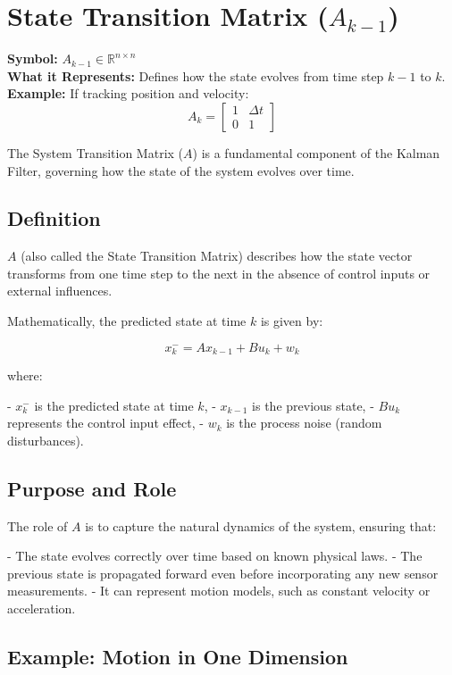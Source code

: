 \documentclass{article}
\begin{document}
\section{State Transition Matrix ($A_{k-1}$)}
\textbf{Symbol:} $A_{k-1} \in \mathbb{R}^{n \times n}$  \\
\textbf{What it Represents:} Defines how the state evolves from time step $k-1$ to $k$.  \\
\textbf{Example:} If tracking position and velocity:
\[
    A_k = \begin{bmatrix} 1 & \Delta t \\ 0 & 1 \end{bmatrix}
\]  


The System Transition Matrix ($A$) is a fundamental component of the Kalman Filter, governing how the state of the system evolves over time.

\subsection*{Definition}

$A$ (also called the State Transition Matrix) describes how the state vector transforms from one time step to the next in the absence of control inputs or external influences.

Mathematically, the predicted state at time $k$ is given by:

\begin{equation}
    x_k^- = A x_{k-1} + B u_k + w_k
\end{equation}

where:

- $x_k^-$ is the predicted state at time $k$,
- $x_{k-1}$ is the previous state,
- $B u_k$ represents the control input effect,
- $w_k$ is the process noise (random disturbances).

\subsection*{Purpose and Role}

The role of $A$ is to capture the natural dynamics of the system, ensuring that:

- The state evolves correctly over time based on known physical laws.
- The previous state is propagated forward even before incorporating any new sensor measurements.
- It can represent motion models, such as constant velocity or acceleration.

\subsection*{Example: Motion in One Dimension}
\end{document}
